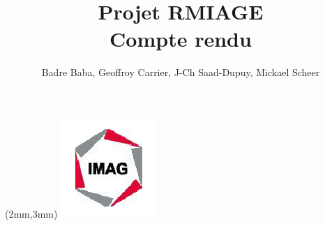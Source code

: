 \documentclass[a4paper,10pt,twoside]{article}
\begin{document}
\title{Projet RMIAGE\\ \Huge{Compte rendu}}
\author{
	Badre Baba, Geoffroy Carrier, J-Ch Saad-Dupuy, Mickael Scheer
}

\begin{center}
\begin{textblock*}{35cm}(2mm,3mm)
\includegraphics[scale=0.8]{../cc/imag_logo.png}
\end{textblock*}
\end{center}
 
\maketitle





\end{document}
